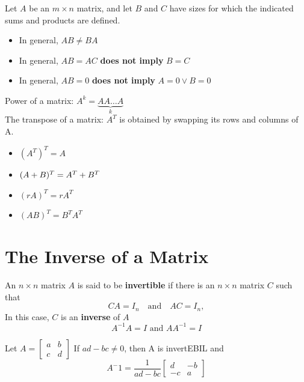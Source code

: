 \documentclass{report}
\begin{document}
\begin{tcolorbox}[colback=blue!5!white, colframe=red!75!black, title=WARNING]
Let $A$ be an $m \times n$ matrix, and let $B$ and $C$ have sizes for which the indicated sums and products are defined.

\begin{itemize}
    \item In general, $AB \ne BA$
    \item In general, $AB = AC$ \textbf{does not imply} $B = C$
    \item In general, $AB = 0$ \textbf{does not imply} $A = 0 \vee B = 0$
\end{itemize}
\end{tcolorbox}

Power of a matrix: $A^k = \underbrace{A A \dots A}_{k}$ \\

The transpose of a matrix: \( A^T \) is obtained by swapping its rows and columns of A.
\begin{theorem}\end{theorem}

\begin{tcolorbox}[colback=blue!5!white, colframe=blue!75!black]
\begin{itemize}
    \item $(A^T)^T = A$
    \item $(A + B)^T = A^{T} + B^T$
    \item $(rA)^T = r A^T$
    \item $(AB)^T = B^T A^T$
\end{itemize}
\end{tcolorbox}

\section{The Inverse of a Matrix}

An \( n \times n \) matrix \( A \) is said to be \textbf{invertible} if there is an \( n \times n \) matrix \( C \) such that
\[
C A = I_n \quad \text{and} \quad A C = I_n,
\]
In this case, $C$ is an \textbf{inverse} of $A$
\[
A^{-1} A = I \text{ and } A A^{-1} = I
\]

\begin{theorem}
    Let $A = \begin{bmatrix}
        a & b \\ c & d
    \end{bmatrix}$
    If $ad - bc \ne 0$, then A is invertEBIL and
    \[
    A^-1 = \frac{1}{ad -bc}\begin{bmatrix}
        d & -b \\ -c & a
    \end{bmatrix}
    \]
\end{theorem}
\end{document}

